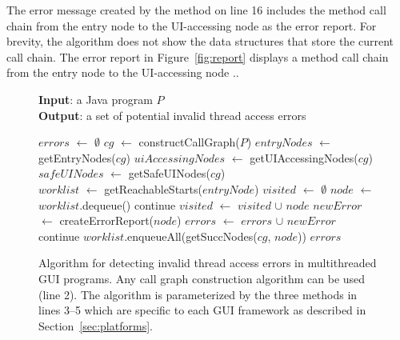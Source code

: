 The error message created by the method  on line 16
includes the method call chain from the entry node to the UI-accessing node
as the error report. For brevity, the algorithm does not show the data structures that store
the current call chain.
The error report in Figure~\ref{fig:report} displays a method call chain from the entry
node  to the UI-accessing node ..



\begin{figure}[t]
\textbf{Input}: a Java program $\mathit{P}$\\
\textbf{Output}: a set of potential invalid thread access errors\\
\vspace{-4mm}
\begin{algorithmic}[1]
\STATE $\mathit{errors}$ $\leftarrow$ $\emptyset$ 
\STATE $\mathit{cg}$ $\leftarrow$ constructCallGraph($\mathit{P}$)
\STATE $\mathit{entryNodes}$ $\leftarrow$ getEntryNodes($\mathit{cg}$)
\STATE $\mathit{uiAccessingNodes}$ $\leftarrow$ getUIAccessingNodes($\mathit{cg}$)
\STATE $\mathit{safeUINodes}$ $\leftarrow$ getSafeUINodes($\mathit{cg}$)\\
\STATE $\mathit{worklist}$ $\leftarrow$ getReachableStarts($\mathit{entryNode}$)
\STATE $\mathit{visited}$ $\leftarrow$ $\emptyset$
\STATE $\mathit{node}$ $\leftarrow$ $\mathit{worklist}$.dequeue()
\STATE continue
\ENDIF
\STATE $\mathit{visited}$ $\leftarrow$ $\mathit{visited}$ $\cup$ $\mathit{node}$
\STATE $\mathit{newError}$ $\leftarrow$ createErrorReport($\mathit{node}$)
\STATE $\mathit{errors}$ $\leftarrow$ $\mathit{errors}$ $\cup$ $\mathit{newError}$
\STATE continue
\ELSE
\STATE $\mathit{worklist}$.enqueueAll(getSuccNodes($\mathit{cg}$, $\mathit{node}$))
\ENDIF 
\ENDWHILE
\ENDFOR
\RETURN $errors$
\vspace{-2mm}
\end{algorithmic}
\caption{Algorithm for detecting invalid thread access errors in multithreaded GUI programs. 
Any call graph construction algorithm can be used (line 2). The algorithm
is parameterized by the three methods in lines 3--5 which are specific to each GUI framework
 as described in Section~\ref{sec:platforms}.
} \label{fig:detectalgorithm}
\end{figure}

